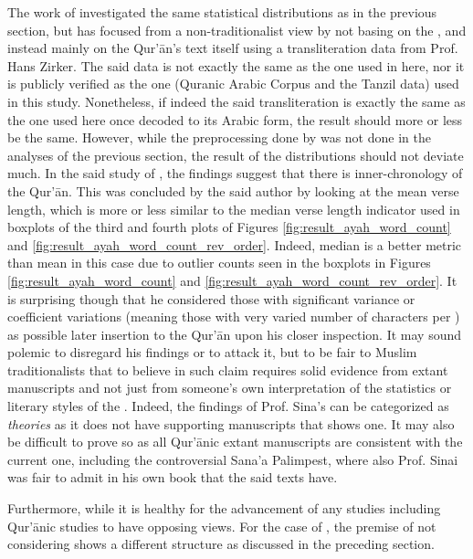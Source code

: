 The work of  investigated the same statistical distributions as in the previous section, but has focused from a non-traditionalist view by not basing on the  , and instead mainly on the Qur'\=an's text itself using a transliteration data from Prof. Hans Zirker. The said data is not exactly the same as the one used in here, nor it is publicly verified as the one (Quranic Arabic Corpus and the Tanzil data) used in this study. Nonetheless, if indeed the said transliteration is exactly the same as the one used here once decoded to its Arabic form, the result should more or less be the same. However, while the preprocessing done by  was not done in the analyses of the previous section, the result of the distributions should not deviate much. In the said study of , the findings suggest that there is inner-chronology of the Qur'\=an. This was concluded by the said author by looking at the mean verse length, which is more or less similar to the median verse length indicator used in boxplots of the third and fourth plots of Figures \ref{fig:result_ayah_word_count} and \ref{fig:result_ayah_word_count_rev_order}. Indeed, median is a better metric than mean in this case due to outlier counts seen in the boxplots in Figures \ref{fig:result_ayah_word_count} and \ref{fig:result_ayah_word_count_rev_order}. It is surprising though that he considered those with significant variance or coefficient variations (meaning those   with very varied number of characters per  ) as possible later insertion to the Qur'\=an upon his closer inspection. It may sound polemic to disregard his findings or to attack it, but to be fair to Muslim traditionalists that to believe in such claim requires solid evidence from extant manuscripts and not just from someone's own interpretation of the statistics or literary styles of the  . Indeed, the findings of Prof. Sina's can be categorized as \textit{theories} as it does not have supporting manuscripts that shows one. It may also be difficult to prove so as all Qur'\=anic extant manuscripts are consistent with the current one, including the controversial Sana'a Palimpest, where also Prof. Sinai was fair to admit in his own book \cite{sinai2017} that the said texts have. 

Furthermore, while it is healthy for the advancement of any studies including Qur'\=anic studies to have opposing views. For the case of , the premise of not considering   shows a different structure as discussed in the preceding section.
